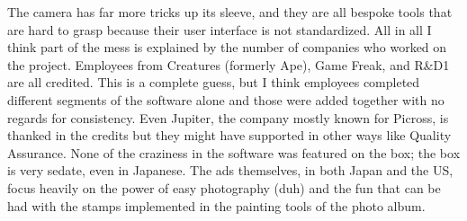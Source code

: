 \documentclass{book}
\let\oldcenter\center
\let\oldendcenter\endcenter
\renewenvironment{center}{\setlength\topsep{0pt}\oldcenter}{\oldendcenter}
\begin{document}
\begin{center}
\vspace{8pt}
\quad\vspace{4pt}
\quad\vspace{4pt}
\quad\vspace{4pt}
\quad\vspace{4pt}
\quad\vspace{4pt}
\end{center}

The camera has far more tricks up its sleeve, and they are all bespoke tools that are hard to grasp because their user interface is not standardized. All in all I think part of the mess is explained by the number of companies who worked on the project. Employees from Creatures (formerly Ape), Game Freak, and R\&D1 are all credited. This is a complete guess, but I think employees completed different segments of the software alone and those were added together with no regards for consistency. Even Jupiter, the company mostly known for Picross, is thanked in the credits but they might have supported in other ways like Quality Assurance. None of the craziness in the software was featured on the box; the box is very sedate, even in Japanese. The ads themselves, in both Japan and the US, focus heavily on the power of easy photography (duh) and the fun that can be had with the stamps implemented in the painting tools of the photo album.

\begin{center}
\vspace{8pt}
\quad\vspace{4pt}
\end{center}
\end{document}
